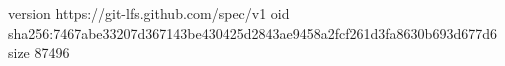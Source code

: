 version https://git-lfs.github.com/spec/v1
oid sha256:7467abe33207d367143be430425d2843ae9458a2fcf261d3fa8630b693d677d6
size 87496
